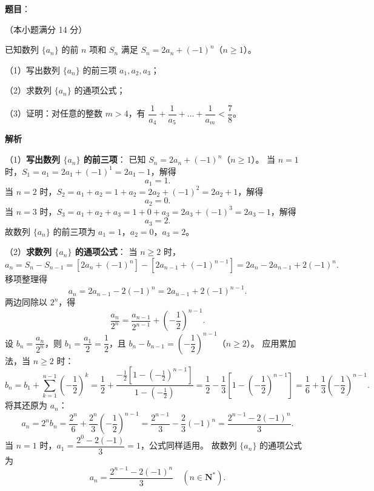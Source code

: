 \begin{answer}

\textbf{题目}：

（本小题满分 14 分）

已知数列 $\{a_n\}$ 的前 $n$ 项和 $S_n$ 满足 $S_n=2a_n+(-1)^n$（$n\geqslant 1$）。

（1）写出数列 $\{a_n\}$ 的前三项 $a_1, a_2, a_3$；

（2）求数列 $\{a_n\}$ 的通项公式；

（3）证明：对任意的整数 $m>4$，有 $\dfrac{1}{a_4}+\dfrac{1}{a_5}+\dots+\dfrac{1}{a_m}<\dfrac{7}{8}$。

\textbf{解析}

（1）\textbf{写出数列 $\{a_n\}$ 的前三项}：
已知 $S_n=2a_n+(-1)^n$（$n\geqslant 1$）。
当 $n=1$ 时，$S_1=a_1=2a_1+(-1)^1=2a_1-1$，解得
\nopagebreak[4]
\[
a_1=1.
\]
当 $n=2$ 时，$S_2=a_1+a_2=1+a_2=2a_2+(-1)^2=2a_2+1$，解得
\nopagebreak[4]
\[
a_2=0.
\]
当 $n=3$ 时，$S_3=a_1+a_2+a_3=1+0+a_3=2a_3+(-1)^3=2a_3-1$，解得
\nopagebreak[4]
\[
a_3=2.
\]
故数列 $\{a_n\}$ 的前三项为 $a_1=1$，$a_2=0$，$a_3=2$。

（2）\textbf{求数列 $\{a_n\}$ 的通项公式}：
当 $n\geqslant 2$ 时，
\nopagebreak[4]
\[
a_n=S_n-S_{n-1}=[2a_n+(-1)^n]-[2a_{n-1}+(-1)^{n-1}]=2a_n-2a_{n-1}+2(-1)^n.
\]
移项整理得
\nopagebreak[4]
\[
a_n=2a_{n-1}-2(-1)^n=2a_{n-1}+2(-1)^{n-1}.
\]
两边同除以 $2^n$，得
\nopagebreak[4]
\[
\frac{a_n}{2^n}=\frac{a_{n-1}}{2^{n-1}}+\left(-\frac{1}{2}\right)^{n-1}.
\]
设 $b_n=\dfrac{a_n}{2^n}$，则 $b_1=\dfrac{a_1}{2}=\dfrac{1}{2}$，且 $b_n-b_{n-1}=\left(-\dfrac{1}{2}\right)^{n-1}$（$n\geqslant 2$）。
应用累加法，当 $n\geqslant 2$ 时：
\nopagebreak[4]
\[
b_n=b_1+\sum_{k=1}^{n-1}\left(-\frac{1}{2}\right)^k=\frac{1}{2}+\frac{-\frac{1}{2}\left[1-\left(-\frac{1}{2}\right)^{n-1}\right]}{1-\left(-\frac{1}{2}\right)}=\frac{1}{2}-\frac{1}{3}\left[1-\left(-\frac{1}{2}\right)^{n-1}\right]=\frac{1}{6}+\frac{1}{3}\left(-\frac{1}{2}\right)^{n-1}.
\]
将其还原为 $a_n$：
\nopagebreak[4]
\[
a_n=2^n b_n=\frac{2^n}{6}+\frac{2^n}{3}\left(-\frac{1}{2}\right)^{n-1}=\frac{2^{n-1}}{3}-\frac{2}{3}(-1)^n=\frac{2^{n-1}-2(-1)^n}{3}.
\]
当 $n=1$ 时，$a_1=\dfrac{2^0-2(-1)}{3}=1$，公式同样适用。
故数列 $\{a_n\}$ 的通项公式为
\nopagebreak[4]
\[
a_n=\frac{2^{n-1}-2(-1)^n}{3}\quad(n\in\mathbf{N}^*).
\]


\end{answer}
